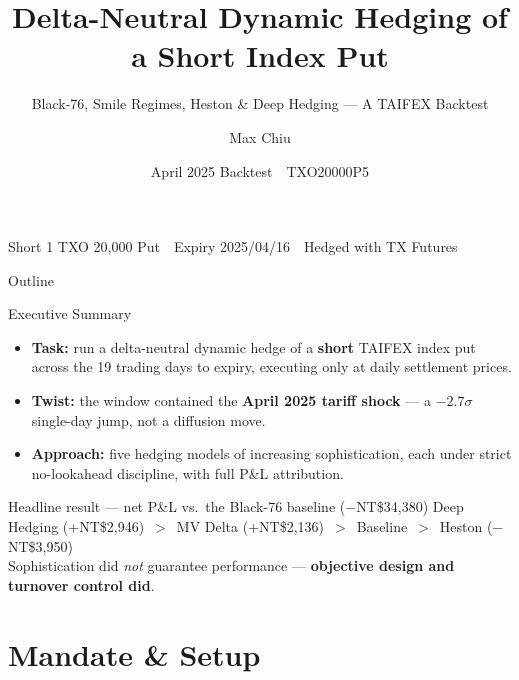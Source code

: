 \documentclass[aspectratio=169,t]{beamer}
\title[Delta-Neutral Dynamic Hedging]{Delta-Neutral Dynamic Hedging of a Short Index Put}
\subtitle{Black-76, Smile Regimes, Heston \& Deep Hedging --- A TAIFEX Backtest}
\author{Max Chiu}
\institute{Personal Quantitative Research Project}
\date{April 2025 Backtest \,\textbar\, TXO20000P5}
\newcommand{\nt}[1]{NT\$#1}
\newcommand{\gain}[1]{\textcolor{good}{#1}}
\newcommand{\loss}[1]{\textcolor{accent}{#1}}
\begin{document}
\begin{frame}
  \titlepage
  \vfill
  \begin{center}\small
  Short 1 TXO 20{,}000 Put \,\textbar\, Expiry 2025/04/16 \,\textbar\, Hedged with TX Futures
  \end{center}
\end{frame}

\begin{frame}{Outline}
  \tableofcontents
\end{frame}

\begin{frame}{Executive Summary}
  \begin{itemize}
    \item \textbf{Task:} run a delta-neutral dynamic hedge of a \textbf{short} TAIFEX index put across the 19 trading days to expiry, executing only at daily settlement prices.
    \item \textbf{Twist:} the window contained the \textbf{April 2025 tariff shock} --- a $-2.7\sigma$ single-day jump, not a diffusion move.
    \item \textbf{Approach:} five hedging models of increasing sophistication, each under strict no-lookahead discipline, with full P\&L attribution.
  \end{itemize}
  \vspace{0.4em}
  \begin{block}{Headline result --- net P\&L vs.\ the Black-76 baseline (\loss{$-$\nt{34{,}380}})}
    \centering
    Deep Hedging \gain{(+\nt{2{,}946})} \,$>$\, MV Delta \gain{(+\nt{2{,}136})} \,$>$\, Baseline \,$>$\, Heston \loss{($-$\nt{3{,}950})}\\[0.2em]
    {\small Sophistication did \emph{not} guarantee performance --- \textbf{objective design and turnover control did}.}
  \end{block}
\end{frame}

\section{Mandate \& Setup}
\end{document}
